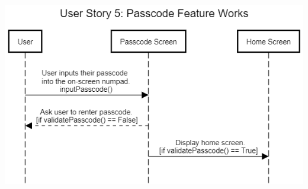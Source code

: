 \documentclass[letterpaper,12pt,titlepage]{article}
\begin{document}
\newline
\newline
\includegraphics[scale=.66]{User_Story_5__Passcode_Feature_Works}~\cite{seqdia}

\newpage
\end{document}
